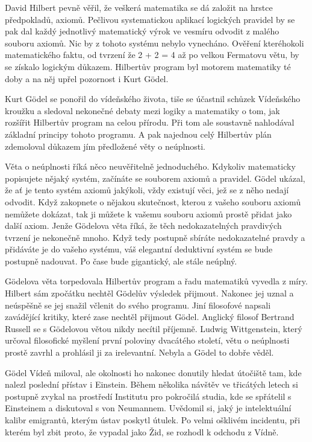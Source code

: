   David Hilbert pevně věřil, že veškerá matematika se dá založit na hrstce předpokladů, axiomů.
  Pečlivou systematickou aplikací logických pravidel by se pak dal každý jednotlivý matematický
  výrok ve vesmíru odvodit z malého souboru axiomů. Nic by z tohoto systému nebylo vynecháno.
  Ověření kteréhokoli matematického faktu, od tvrzení že 2 + 2 = 4 až po velkou Fermatovu větu, by
  se získalo logickým důkazem. Hilbertův program byl motorem matematiky té doby a na něj upřel
  pozornost i Kurt Gödel. 
  
  Kurt Gödel se ponořil do vídeňského života, tiše se účastnil schůzek Vídeňského kroužku a sledoval
  nekonečné debaty mezi logiky a matematiky o tom, jak rozšířit Hilbertův program na celou přírodu.
  Při tom ale soustavně nahlodával základní principy tohoto programu. A pak najednou celý Hilbertův
  plán zdemoloval důkazem jím předložené věty o neúplnosti. 
  
  Věta o neúplnosti říká něco neuvěřitelně jednoduchého. Kdykoliv matematicky popisujete nějaký
  systém, začínáte se souborem axiomů a pravidel. Gödel ukázal, že ať je tento systém axiomů
  jakýkoli, vždy existují věci, jež se z něho nedají odvodit. Když zakopnete o nějakou skutečnost,
  kterou z vašeho souboru axiomů nemůžete dokázat, tak ji můžete k vašemu souboru axiomů prostě
  přidat jako další axiom. Jenže Gödelova věta říká, že těch nedokazatelných pravdivých tvrzení je
  nekonečně mnoho. Když tedy postupně sbíráte nedokazatelné pravdy a přidáváte je do vašeho systému,
  váš elegantní deduktivní systém se bude postupně nadouvat. Po čase bude gigantický, ale stále
  neúplný. 
  
  Gödelova věta torpedovala Hilbertův program a řadu matematiků vyvedla z míry. Hilbert sám zpočátku
  nechtěl Gödelův výsledek přijmout. Nakonec jej uznal a neúspěšně se jej snažil včlenit do svého
  programu. Jiní filosofové napsali zavádějící kritiky, které zase nechtěl přijmout Gödel. Anglický
  filosof Bertrand Russell se s Gödelovou větou nikdy necítil příjemně. Ludwig Wittgenstein, který
  určoval filosofické myšlení první poloviny dvacátého století, větu o neúplnosti prostě zavrhl a
  prohlásil ji za irelevantní. Nebyla a Gödel to dobře věděl. 
  
  Gödel Vídeň miloval, ale okolnosti ho nakonec donutily hledat útočiště tam, kde nalezl poslední
  přístav i Einstein. Během několika návštěv ve třicátých letech si postupně zvykal na prostředí
  Institutu pro pokročilá studia, kde se spřátelil s Einsteinem a diskutoval s von Neumannem.
  Uvědomil si, jaký je intelektuální kalibr emigrantů, kterým ústav poskytl útulek. Po velmi
  ošklivém incidentu, při kterém byl zbit proto, že vypadal jako Žid, se rozhodl k odchodu z Vídně.
  
